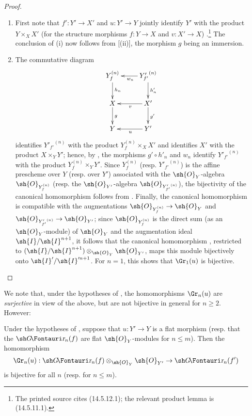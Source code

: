 \begin{proof}
\medskip\noindent
\begin{enumerate}
  \item[(i)] First note that $f':Y'\to X'$ and $u:Y'\to Y$ jointly identify $Y'$ with the product $Y\times_X X'$ (for the structure morphisms $f:Y\to X$ and $v:X'\to X$) .\footnote{The printed source cites (14.5.12.1); the relevant product lemma is (14.5.11.1).}
  The conclusion of (i) now follows from [(ii)], the morphism $g$ being an immersion.
  \item[(ii)] The commutative diagram
  \[
  \xymatrix{
    Y_f^{(n)} \ar[d]^{h_n}  & {Y'_{f'}}^{(n)} \ar[d]^-{h'_n} \ar[l]^{w_n}\\  
    X         \ar[d]^{g}    & X'              \ar[d]^{g'} \ar[l]^v \\  
    Y                       & Y' \ar[l]^u \\  
  }
  \]
  identifies ${Y'_{f'}}^{(n)}$ with the product $Y_f^{(n)}\times_X X'$ and identifies $X'$ with the product $X\times_Y Y'$; hence, by , the morphisms $g'\circ h'_n$ and $w_n$ identify ${Y'_{f'}}^{(n)}$ with the product $Y_f^{(n)}\times_Y Y'$.
  Since $Y_f^{(n)}$ (resp. ${Y'_{f'}}^{(n)}$) is the affine prescheme over $Y$ (resp. over $Y'$) associated with the $\sh{O}_Y$-algebra $\sh{O}_{Y_f^{(n)}}$ (resp. the $\sh{O}_{Y'}$-algebra $\sh{O}_{{Y'_{f'}}^{(n)}}$), the bijectivity of the canonical homomorphism  follows from .
  Finally, the canonical homomorphism  is compatible with the augmentations $\sh{O}_{Y_f^{(n)}} \to \sh{O}_Y$ and $\sh{O}_{{Y'_{f'}}^{(n)}} \to \sh{O}_{Y'}$;
  since $\sh{O}_{Y_f^{(n)}}$ is the direct sum (as an $\sh{O}_Y$-module) of $\sh{O}_Y$ and the augmentation ideal $\sh{I}/\sh{I}^{n+1}$, it follows that the canonical homomorphism , restricted to $(\sh{I}/\sh{I}^{n+1})\otimes_{\sh{O}_Y}\sh{O}_{Y'}$, maps this module bijectively onto $\sh{I}'/\sh{I}'^{n+1}$. For $n=1$, this shows that $\Gr_1(u)$ is bijective.
\end{enumerate}
\end{proof}

We note that, under the hypotheses of , the homomorphisms $\Gr_n(u)$ are \emph{surjective} in view of the above, but are not bijective in general for $n \geq 2$.
However:

\begin{corollary}[16.2.4]
\label{IV.16.2.4}
Under the hypotheses of , suppose that $u: Y' \to Y$ is a flat morphism (resp. that the $\shGr_n(f)$ are flat $\sh{O}_Y$-modules for $n \leq m$).
Then the homomorphism 
\[
  \Gr_n(u):\shGr_n(f) \otimes_{\sh{O}_Y}\sh{O}_{Y'} \to \shGr_n(f')
\]
is bijective for all $n$ (resp. for $n \leq m$).
\end{corollary}

